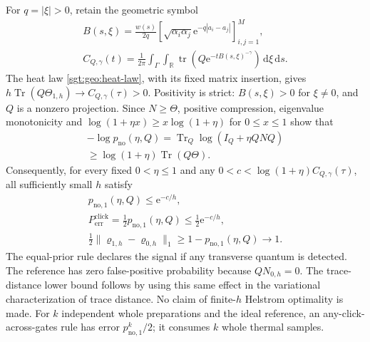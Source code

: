 \documentclass[aps,pra,reprint,superscriptaddress,longbibliography]{revtex4-2}
\newcommand{\Tr}{\operatorname{Tr}}
\newcommand{\dd}{\mathrm d}
\newcommand{\ee}{\mathrm e}
\begin{document}
For $q=|\xi|>0$, retain the geometric symbol
\begin{equation}
\begin{gathered}
 B(s,\xi)=\frac{w(s)}{2q}
   [\sqrt{\alpha_i\alpha_j}\ee^{-q|a_i-a_j|}]_{i,j=1}^M,
 \\
 C_{Q,\gamma}(t)=\frac1{2\pi}\int_\Gamma\int_{\mathbb R}
            \operatorname{tr}(Q\ee^{-tB(s,\xi)^{-\gamma}})
                         \,\dd\xi\,\dd s.
 \label{sgt:bose:Q-coefficient}
\end{gathered}
\end{equation}
The heat law \eqref{sgt:geo:heat-law}, with its fixed matrix insertion,
gives $h\Tr(Q\Theta_{1,h})\to C_{Q,\gamma}(\tau)>0$.
Positivity is strict: $B(s,\xi)>0$ for $\xi\ne0$, and $Q$ is a
nonzero projection.  Since $N\ge\Theta$, positive compression,
eigenvalue monotonicity and
$\log(1+\eta x)\ge x\log(1+\eta)$ for $0\le x\le1$ show that
\begin{equation}
\begin{gathered}
 -\log p_{\mathrm{no}}(\eta,Q)
 =\Tr_Q\log(I_Q+\eta QNQ)
\\
 \ge\log(1+\eta)\Tr(Q\Theta).
 \label{sgt:bose:exponent}
\end{gathered}
\end{equation}
Consequently, for every fixed $0<\eta\le1$ and any
$0<c<\log(1+\eta)C_{Q,\gamma}(\tau)$, all sufficiently small $h$ satisfy
\begin{equation}
\begin{gathered}
 p_{\mathrm{no},1}(\eta,Q)\le\ee^{-c/h},\\
 P_{\mathrm{err}}^{\mathrm{click}}
   =\tfrac12p_{\mathrm{no},1}(\eta,Q)\le\tfrac12\ee^{-c/h},
 \\
 \tfrac12\|\varrho_{1,h}-\varrho_{0,h}\|_1
     \ge1-p_{\mathrm{no},1}(\eta,Q)\longrightarrow1.
 \label{sgt:bose:ideal-error}
\end{gathered}
\end{equation}
The equal-prior rule declares the signal if any transverse quantum is
detected.  The reference has zero false-positive probability because
$QN_{0,h}=0$.  The trace-distance lower bound follows by using this
same effect in the variational characterization of trace distance.
No claim of finite-$h$ Helstrom optimality is made.  For $k$ independent
whole preparations and the ideal reference, an any-click-across-gates
rule has error $p_{\mathrm{no},1}^k/2$; it consumes $k$ whole thermal
samples.
\end{document}

